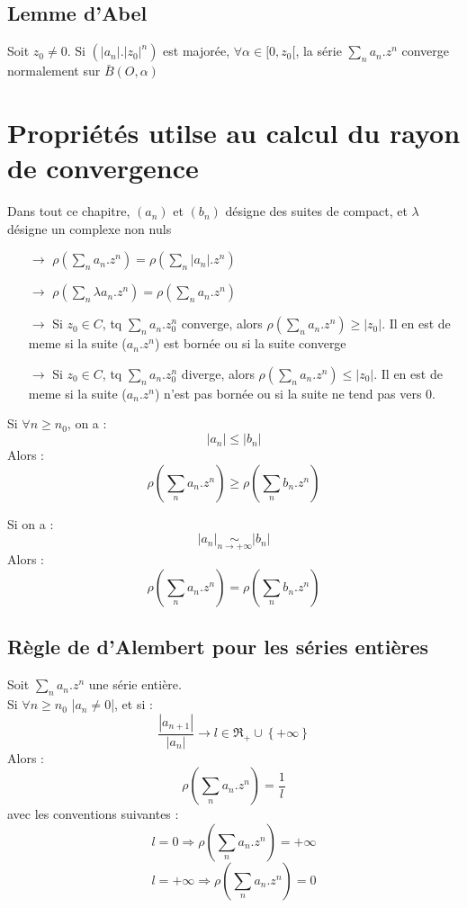 \subsection{Lemme d'Abel}
Soit $z_0 \neq 0$. Si $(|a_n|.|z_0|^n)$ est majorée, $\forall \alpha \in [0,z_0[$, la série $\underset{n} \sum a_n.z^n$ converge normalement sur $\bar{B}(O,\alpha)$
\section{Propriétés utilse au calcul du rayon de convergence}
Dans tout ce chapitre, $(a_n)$ et $(b_n)$ désigne des suites de compact, et $\lambda$ désigne un complexe non nuls
\begin{prop}
\begin{itemize}
 \item[$\rightarrow$] $\rho(\underset{n} \sum a_n.z^n) = \rho(\underset{n} \sum |a_n|.z^n)$
 \item[$\rightarrow$] $\rho(\underset{n} \sum \lambda a_n.z^n) = \rho(\underset{n} \sum a_n.z^n)$
 \item[$\rightarrow$] Si $z_0 \in C$, tq $\underset{n} \sum a_n.z_0^n$ converge, alors $\rho(\underset{n} \sum a_n.z^n) \geq |z_0|$. Il en est de meme si la suite ($a_n.z^n$) est bornée ou si la suite converge 
 \item[$\rightarrow$] Si $z_0 \in C$, tq $\underset{n} \sum a_n.z_0^n$ diverge, alors $\rho(\underset{n} \sum a_n.z^n) \leq |z_0|$. Il en est de meme si la suite ($a_n.z^n$) n'est pas bornée ou si la suite ne tend pas vers 0. 
\end{itemize}
\end{prop}
\begin{prop}
Si $\forall n \geq n_0$, on a : 
$$|a_n| \leq |b_n|$$
Alors : 
$$\rho(\sum_n a_n.z^n) \geq \rho(\sum_n b_n.z^n) $$
\end{prop}
\begin{prop}
Si on a : 
$$|a_n| \underset{n \rightarrow +\infty}\sim |b_n|$$
Alors : 
$$\rho(\sum_n a_n.z^n) = \rho(\sum_n b_n.z^n) $$
\end{prop}
\subsection{Règle de d'Alembert pour les séries entières}
Soit $\underset{n} \sum a_n.z^n$ une série entière.\\
Si $\forall n \geq n_0 $ |$a_n \neq 0$|, et si : 
$$\dfrac{|a_{n+1}|}{|a_n|} \rightarrow l \in \Re_+ \cup \left\lbrace + \infty\right\rbrace $$
Alors : 
$$\rho(\sum_n a_n.z^n) = \dfrac{1}{l}$$
avec les conventions suivantes : 
$$l=0 \Rightarrow \rho(\sum_n a_n.z^n) = +\infty$$
$$l = +\infty \Rightarrow \rho(\sum_n a_n.z^n) = 0$$
